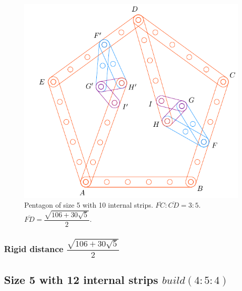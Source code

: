 \documentclass[11pt]{article}
\begin{document}
\begin{figure}[H]
\centering
\includegraphics[scale=0.9]{5/penta5-10a}
\caption{Pentagon of size 5 with 10 internal strips. $\overline{FC} : \overline{CD} = 3:5$. $\overline{FD} = \dfrac{\sqrt{106 + 30\sqrt5}}2$.}
\label{fig:penta5-10a}
\end{figure}

\subsubsection{Rigid distance $\dfrac{\sqrt{106 + 30\sqrt5}}2$}

\subsection{Size 5 with 12 internal strips $build(4:5:4)$}
\end{document}
